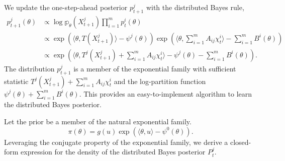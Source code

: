 \documentclass[twoside,11pt]{article}
\numberwithin{equation}{section}
\newcommand\bp{\mathbb{p}}
\begin{document}
{We update the one-step-ahead posterior $p_{t+1}^j$ with the distributed Bayes rule, 
\begin{equation*}
\begin{aligned}
        p_{t+1}^j (\theta) &\propto \log \bp_\theta(X_{t+1}^j) \prod_{i = 1}^m  p_t^i(\theta) \\
        &\propto \exp(\langle \theta, T(X_{t+1}^j) \rangle - \psi^j(\theta))\exp(\langle \theta,\sum_{i = 1}^m A_{ij} \chi_t^i\rangle - \sum_{i = 1}^m B^i(\theta)) \\
        &\propto  \exp\left(\langle \theta,T^j(X_{t+1}^j)  +  \sum_{i = 1}^m A_{ij} \chi_t^i \rangle - \psi^j(\theta) - \sum_{i = 1}^m B^i(\theta) \right). 
\end{aligned}
\end{equation*}
The distribution $p_{t+1}^j$ is a member of the exponential family with sufficient statistic $T^j(X_{t+1}^j)  +  \sum_{i = 1}^m A_{ij} \chi_t^i$ and the log-partition function $\psi^j(\theta) + \sum_{i = 1}^m B^i(\theta)$. This provides an easy-to-implement algorithm to learn the distributed Bayes posterior. 


Let the prior be a member of the natural exponential family. 
\begin{equation} \label{eqn-EF-2}
    \pi(\theta) = g(u) \exp\left(\langle \theta, u\rangle - \psi^0(\theta) \right). 
\end{equation}
Leveraging the conjugate property of the exponential family, we derive a closed-form expression for the density of the distributed Bayes posterior $P_t^j$.

}
\end{document}
